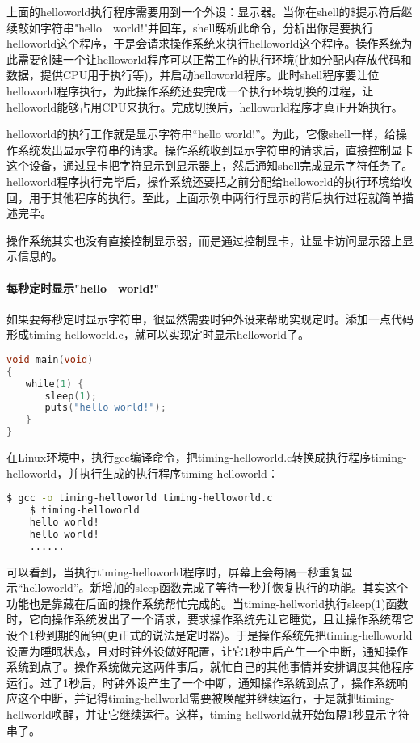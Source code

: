 上面的helloworld执行程序需要用到一个外设：显示器。当你在shell的\$提示符后继续敲如字符串"hello　world!"并回车，shell解析此命令，分析出你是要执行helloworld这个程序，于是会请求操作系统来执行helloworld这个程序。操作系统为此需要创建一个让helloworld程序可以正常工作的执行环境(比如分配内存放代码和数据，提供CPU用于执行等)，并启动helloworld程序。此时shell程序要让位helloworld程序执行，为此操作系统还要完成一个执行环境切换的过程，让helloworld能够占用CPU来执行。完成切换后，helloworld程序才真正开始执行。

helloworld的执行工作就是显示字符串“hello world!”。为此，它像shell一样，给操作系统发出显示字符串的请求。操作系统收到显示字符串的请求后，直接控制显卡这个设备，通过显卡把字符显示到显示器上，然后通知shell完成显示字符任务了。helloworld程序执行完毕后，操作系统还要把之前分配给helloworld的执行环境给收回，用于其他程序的执行。至此，上面示例中两行行显示的背后执行过程就简单描述完毕。

\begin{note} 
操作系统其实也没有直接控制显示器，而是通过控制显卡，让显卡访问显示器上显示信息的。
\end{note}

\paragraph{每秒定时显示"hello　world!"}
如果要每秒定时显示字符串，很显然需要时钟外设来帮助实现定时。添加一点代码形成timing-helloworld.c，就可以实现定时显示helloworld了。
\begin{lstlisting}[language={C}]
void main(void)
{
　　while(1) {
　　　　sleep(1);
　　　　puts("hello world!");
　　}
}
\end{lstlisting}

在Linux环境中，执行gcc编译命令，把timing-helloworld.c转换成执行程序timing-helloworld，并执行生成的执行程序timing-helloworld：
\begin{lstlisting}[language={bash}]
	$ gcc -o timing-helloworld timing-helloworld.c
	$ timing-helloworld
	hello world!
	hello world!
	......
\end{lstlisting}

可以看到，当执行timing-helloworld程序时，屏幕上会每隔一秒重复显示“helloworld”。新增加的sleep函数完成了等待一秒并恢复执行的功能。其实这个功能也是靠藏在后面的操作系统帮忙完成的。当timing-hellworld执行sleep(1)函数时，它向操作系统发出了一个请求，要求操作系统先让它睡觉，且让操作系统帮它设个1秒到期的闹钟(更正式的说法是定时器)。于是操作系统先把timing-helloworld设置为睡眠状态，且对时钟外设做好配置，让它1秒中后产生一个中断，通知操作系统到点了。操作系统做完这两件事后，就忙自己的其他事情并安排调度其他程序运行。过了1秒后，时钟外设产生了一个中断，通知操作系统到点了，操作系统响应这个中断，并记得timing-hellworld需要被唤醒并继续运行，于是就把timing-hellworld唤醒，并让它继续运行。这样，timing-hellworld就开始每隔1秒显示字符串了。

